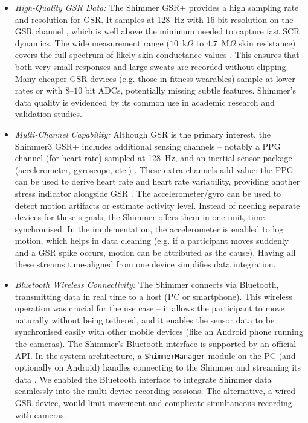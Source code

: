 \documentclass{report}
\begin{document}
    \begin{itemize}
        \item \textit{High-Quality GSR Data:} The Shimmer GSR+ provides a high sampling rate and resolution for GSR. It samples at 128~Hz with 16-bit resolution on the GSR channel \cite{shimmerdoc8}, which is well above the minimum needed to capture fast SCR dynamics. The wide measurement range ($10$~k$\Omega$ to $4.7$~M$\Omega$ skin resistance) covers the full spectrum of likely skin conductance values \cite{shimmerdoc8}. This ensures that both very small responses and large sweats are recorded without clipping. Many cheaper GSR devices (e.g. those in fitness wearables) sample at lower rates or with $8$--$10$ bit ADCs, potentially missing subtle features. Shimmer's data quality is evidenced by its common use in academic research and validation studies.

        \item \textit{Multi-Channel Capability:} Although GSR is the primary interest, the Shimmer3 GSR+ includes additional sensing channels -- notably a PPG channel (for heart rate) sampled at 128~Hz, and an inertial sensor package (accelerometer, gyroscope, etc.) \cite{shimmerapi15}. These extra channels add value: the PPG can be used to derive heart rate and heart rate variability, providing another stress indicator alongside GSR \cite{shimmerapi15}. The accelerometer/gyro can be used to detect motion artifacts or estimate activity level. Instead of needing separate devices for these signals, the Shimmer offers them in one unit, time-synchronised. In the implementation, the accelerometer is enabled to log motion, which helps in data cleaning (e.g. if a participant moves suddenly and a GSR spike occurs, motion can be attributed as the cause). Having all these streams time-aligned from one device simplifies data integration.

        \item \textit{Bluetooth Wireless Connectivity:} The Shimmer connects via Bluetooth, transmitting data in real time to a host (PC or smartphone). This wireless operation was crucial for the use case -- it allows the participant to move naturally without being tethered, and it enables the sensor data to be synchronised easily with other mobile devices (like an Android phone running the cameras). The Shimmer's Bluetooth interface is supported by an official API. In the system architecture, a \texttt{ShimmerManager} module on the PC (and optionally on Android) handles connecting to the Shimmer and streaming its data \cite{shimmerapi15}. We enabled the Bluetooth interface to integrate Shimmer data seamlessly into the multi-device recording sessions. The alternative, a wired GSR device, would limit movement and complicate simultaneous recording with cameras.


\end{itemize}
\end{document}
